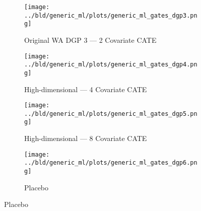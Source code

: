 \documentclass[11pt, a4paper, leqno]{article}
\begin{document}
\begin{figure}
    \caption{Simulation Results: Generic ML --- GATES}\label{fig:gates}

    \centering
     \begin{subfigure}[b]{0.475\textwidth}
         \centering
         \texttt{[image: ../bld/generic\_ml/plots/generic\_ml\_gates\_dgp3.png]}
         \caption{Original WA DGP 3 --- 2 Covariate CATE}\label{fig_gates:dgp3}
     \end{subfigure}
     \hfill
     \begin{subfigure}[b]{0.475\textwidth}
         \centering
         \texttt{[image: ../bld/generic\_ml/plots/generic\_ml\_gates\_dgp4.png]}
         \caption{High-dimensional --- 4 Covariate CATE}\label{fig_gates:dgp4}
     \end{subfigure}

     \begin{subfigure}[b]{0.475\textwidth}
         \centering
         \texttt{[image: ../bld/generic\_ml/plots/generic\_ml\_gates\_dgp5.png]}
         \caption{High-dimensional --- 8 Covariate CATE}\label{fig_gates:dgp5}
     \end{subfigure}
     \begin{subfigure}[b]{0.475\textwidth}
         \centering
         \texttt{[image: ../bld/generic\_ml/plots/generic\_ml\_gates\_dgp6.png]}
         \caption{Placebo}\label{fig_gates:dgp6}
     \end{subfigure}


\end{figure}
\end{document}
